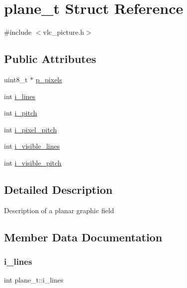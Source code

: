\hypertarget{structplane__t}{}\section{plane\+\_\+t Struct Reference}
\label{structplane__t}


{\ttfamily \#include $<$vlc\+\_\+picture.\+h$>$}

\subsection*{Public Attributes}
\begin{DoxyCompactItemize}
\item 
uint8\+\_\+t $\ast$ \hyperlink{structplane__t_a95aba7322ec8203d7d0975d6b31b4985}{p\+\_\+pixels}
\item 
int \hyperlink{structplane__t_a2479d8e56a8901e13eaf2aa201fd3a17}{i\+\_\+lines}
\item 
int \hyperlink{structplane__t_ad583ae84ac5172b4c0e1e0e5068b16eb}{i\+\_\+pitch}
\item 
int \hyperlink{structplane__t_a52a4b3f9337f8348f57a15b4e1b19caf}{i\+\_\+pixel\+\_\+pitch}
\item 
int \hyperlink{structplane__t_ab11a1f3e9fb2f9d39c6115e45f7868b5}{i\+\_\+visible\+\_\+lines}
\item 
int \hyperlink{structplane__t_a42a2c9a12335e7644c759c7ad88a56e8}{i\+\_\+visible\+\_\+pitch}
\end{DoxyCompactItemize}


\subsection{Detailed Description}
Description of a planar graphic field 

\subsection{Member Data Documentation}
\mbox{\label{structplane__t_a2479d8e56a8901e13eaf2aa201fd3a17}} 
\subsubsection{\texorpdfstring{i\+\_\+lines}{i\_lines}}
{\footnotesize\ttfamily int plane\+\_\+t\+::i\+\_\+lines}

